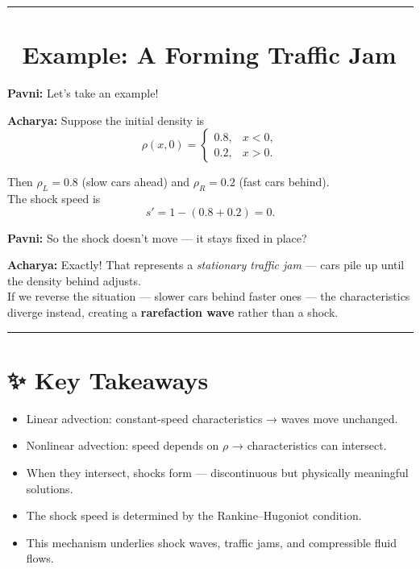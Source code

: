 \documentclass[
  letterpaper,
]{book}
\providecommand{\tightlist}{%
  \setlength{\itemsep}{0pt}\setlength{\parskip}{0pt}}
\begin{document}
\begin{center}\rule{0.5\linewidth}{0.5pt}\end{center}

\section{🌊 Example: A Forming Traffic
Jam}\label{example-a-forming-traffic-jam}

\textbf{Pavni:} Let's take an example!

\textbf{Acharya:} Suppose the initial density is \[
\rho(x,0) =
\begin{cases}
0.8, & x < 0, \\
0.2, & x > 0.
\end{cases}
\]

Then \(\rho_L = 0.8\) (slow cars ahead) and \(\rho_R = 0.2\) (fast cars
behind).\\
The shock speed is \[
s' = 1 - (0.8 + 0.2) = 0.
\]

\textbf{Pavni:} So the shock doesn't move --- it stays fixed in place?

\textbf{Acharya:} Exactly! That represents a \emph{stationary traffic
jam} --- cars pile up until the density behind adjusts.\\
If we reverse the situation --- slower cars behind faster ones --- the
characteristics diverge instead, creating a \textbf{rarefaction wave}
rather than a shock.

\begin{center}\rule{0.5\linewidth}{0.5pt}\end{center}

\section{✨ Key Takeaways}\label{key-takeaways}

\begin{itemize}
\tightlist
\item
  Linear advection: constant-speed characteristics → waves move
  unchanged.\\
\item
  Nonlinear advection: speed depends on \(\rho\) → characteristics can
  intersect.\\
\item
  When they intersect, shocks form --- discontinuous but physically
  meaningful solutions.\\
\item
  The shock speed is determined by the Rankine--Hugoniot condition.\\
\item
  This mechanism underlies shock waves, traffic jams, and compressible
  fluid flows.
\end{itemize}
\end{document}
